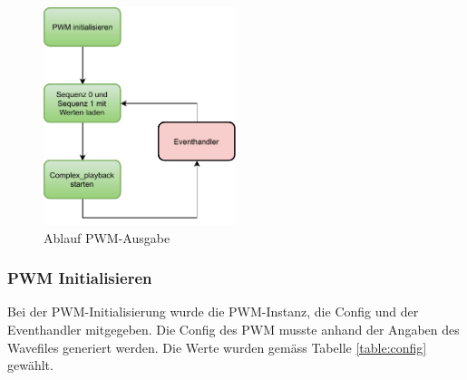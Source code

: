 \begin{figure}[H]
	\begin{center}
		\includegraphics[width=0.5\textwidth]{data/pwm_ablauf}
		\caption[Ablauf PWM-Ausgabe]{Ablauf PWM-Ausgabe} %
		\label{fig:pwm_ablauf}
	\end{center}
\end{figure}

\subsubsection*{PWM Initialisieren}\label{sec:PWM initialisieren}
Bei der PWM-Initialisierung wurde die PWM-Instanz, die Config und der Eventhandler mitgegeben. Die Config des PWM musste anhand der Angaben des Wavefiles generiert werden. Die Werte wurden gemäss Tabelle \ref{table:config} gewählt.

